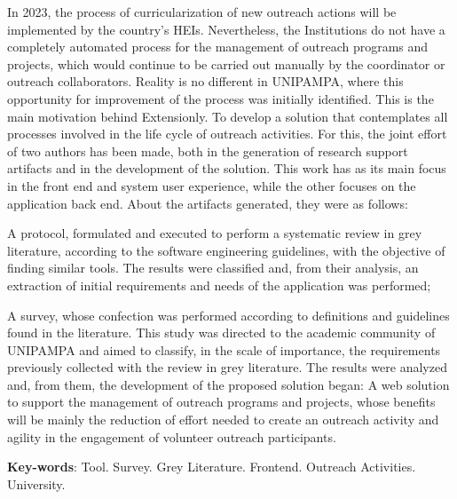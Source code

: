 \begin{resumo}[Abstract]
  In 2023, the process of curricularization of new outreach actions will be implemented by the country's \aclp{HEI}. Nevertheless, the Institutions do not have a completely automated process for the management of outreach programs and projects, which would continue to be carried out manually by the coordinator or outreach collaborators. Reality is no different in \acs{UNIPAMPA}, where this opportunity for improvement of the process was initially identified. This is the main motivation behind Extensionly. To develop a solution that contemplates all processes involved in the life cycle of outreach activities. For this, the joint effort of two authors has been made, both in the generation of research support artifacts and in the development of the solution. This work has as its main focus in the front end and system user experience, while the other focuses on the application back end. About the artifacts generated, they were as follows:
  \begin{inparaenum}[(a)]
    \item A protocol, formulated and executed to perform a systematic review in grey literature, according to the software engineering guidelines, with the objective of finding similar tools. The results were classified and, from their analysis, an extraction of initial requirements and needs of the application was performed;
    \item A survey, whose confection was performed according to definitions and guidelines found in the literature. This study was directed to the academic community of \acs{UNIPAMPA} and aimed to classify, in the scale of importance, the requirements previously collected with the review in grey literature. The results were analyzed and, from them, the development of the proposed solution began: A web solution to support the management of outreach programs and projects, whose benefits will be mainly the reduction of effort needed to create an outreach activity and agility in the engagement of volunteer outreach participants.
  \end{inparaenum}

  \vspace{\onelineskip}

  \noindent
  \textbf{Key-words}: Tool. Survey. Grey Literature. Frontend. Outreach Activities. University.
\end{resumo}
